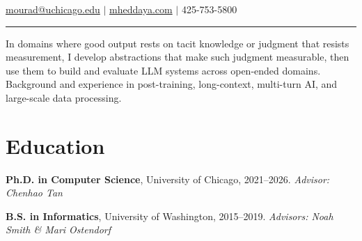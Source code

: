 \documentclass[11pt,letterpaper]{article}
\begin{document}
\hfill{\normalsize \href{mailto:mourad@uchicago.edu}{mourad@uchicago.edu} $|$ \href{https://mheddaya.com}{mheddaya.com} $|$ 425-753-5800}
\vspace{2pt}
\hrule

\vspace{12pt}
\noindent 
In domains where good output rests on tacit knowledge or judgment that resists measurement, I develop abstractions that make such judgment measurable, then use them to build and evaluate LLM systems across open-ended domains.
Background and experience in post-training, long-context, multi-turn AI, and large-scale data processing.

\section*{Education}

\noindent\textbf{Ph.D. in Computer Science}, University of Chicago, 2021--2026. \textit{Advisor: Chenhao Tan}

\vspace{4pt}

\noindent\textbf{B.S. in Informatics}, University of Washington, 2015--2019. \textit{Advisors: Noah Smith \& Mari Ostendorf}

\end{document}
